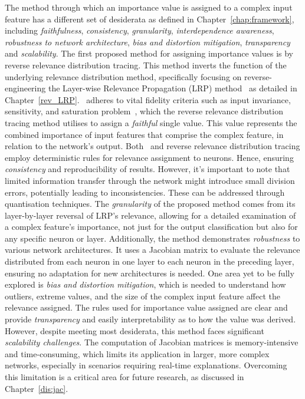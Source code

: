 The method through which an importance value is assigned to a complex input feature has a different set of desiderata as defined in Chapter~\ref{chap:framework}, including \emph{faithfulness}, \emph{consistency}, \emph{granularity}, \emph{interdependence awareness}, \emph{robustness to network architecture}, \emph{bias and distortion mitigation}, \emph{transparency} and \emph{scalability}. The first proposed method for assigning importance values is by reverse relevance distribution tracing. This method inverts the function of the underlying relevance distribution method, specifically focusing on reverse-engineering the Layer-wise Relevance Propagation (LRP) method~\cite{bach2015pixel} as detailed in Chapter~\ref{rev_LRP}. \LRP\ adheres to vital fidelity criteria such as input invariance, sensitivity, and saturation problem~\cite{NielsenDRRB22}, which the reverse relevance distribution tracing method utilises to assign a \emph{faithful} single value. This value represents the combined importance of input features that comprise the complex feature, in relation to the network's output. Both \LRP\ and reverse relevance distribution tracing employ deterministic rules for relevance assignment to neurons. Hence, ensuring \emph{consistency} and reproducibility of results. However, it's important to note that limited information transfer through the network might introduce small division errors, potentially leading to inconsistencies. These can be addressed through quantisation techniques. The \emph{granularity} of the proposed method comes from its layer-by-layer reversal of LRP's relevance, allowing for a detailed examination of a complex feature's importance, not just for the output classification but also for any specific neuron or layer. Additionally, the method demonstrates \emph{robustness} to various network architectures. It uses a Jacobian matrix to evaluate the relevance distributed from each neuron in one layer to each neuron in the preceding layer, ensuring no adaptation for new architectures is needed. One area yet to be fully explored is \emph{bias and distortion mitigation}, which is needed to understand how outliers, extreme values, and the size of the complex input feature affect the relevance assigned. The rules used for importance value assigned are clear and provide \emph{transparency} and easily interpretability as to how the value was derived. However, despite meeting most desiderata, this method faces significant \emph{scalability challenges}. The computation of Jacobian matrices is memory-intensive and time-consuming, which limits its application in larger, more complex networks, especially in scenarios requiring real-time explanations. Overcoming this limitation is a critical area for future research, as discussed in Chapter~\ref{dis:jac}.


